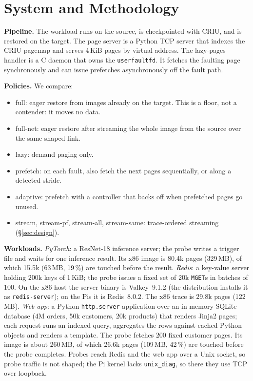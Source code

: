 \documentclass[conference]{IEEEtran}
\newcommand{\uffd}{\texttt{userfaultfd}\xspace}
\newcommand{\mode}[1]{\textsf{#1}}
\begin{document}
\section{System and Methodology}
\label{sec:setup}

\textbf{Pipeline.} The workload runs on the source, is checkpointed with
CRIU, and is restored on the target. The page server is a Python TCP server
that indexes the CRIU pagemap and serves 4\,KiB pages by virtual address. The
lazy-pages handler is a C daemon that owns the \uffd. It fetches the faulting
page synchronously and can issue prefetches asynchronously off the fault path.

\textbf{Policies.} We compare:
\begin{itemize}
\item \mode{full}: eager restore from images already on the target. This is a
floor, not a contender: it moves no data.
\item \mode{full-net}: eager restore after streaming the whole image from the
source over the same shaped link.
\item \mode{lazy}: demand paging only.
\item \mode{prefetch}: on each fault, also fetch the next pages
sequentially, or along a detected stride.
\item \mode{adaptive}: \mode{prefetch} with a controller that backs off when
prefetched pages go unused.
\item \mode{stream}, \mode{stream-pf}, \mode{stream-all}, \mode{stream-same}:
trace-ordered streaming (\S\ref{sec:design}).
\end{itemize}

\textbf{Workloads.}
\emph{PyTorch}: a ResNet-18 inference server; the probe writes a trigger
file and waits for one inference result. Its x86 image is 80.4k pages
(329\,MB), of which 15.5k (63\,MB, 19\,\%) are touched before the result.
\emph{Redis}: a key-value server holding 200k keys of 1\,KiB; the probe
issues a fixed set of 20k \texttt{MGET}s in batches of 100. On the x86 host
the server binary is Valkey~9.1.2 (the distribution installs it as
\texttt{redis-server}); on the Pis it is Redis~8.0.2. The x86 trace is 29.8k
pages (122\,MB).
\emph{Web app}: a Python \texttt{http.server} application over an in-memory
SQLite database (4M orders, 50k customers, 20k products) that renders
Jinja2 pages; each request runs an indexed query, aggregates the rows
against cached Python objects and renders a template. The probe fetches 200
fixed customer pages. Its image is about 260\,MB, of which 26.6k pages
(109\,MB, 42\,\%) are touched before the probe completes.
Probes reach Redis and the web app over a Unix socket, so probe traffic is
not shaped; the Pi kernel lacks \texttt{unix\_diag}, so there they use TCP
over loopback.
\end{document}
